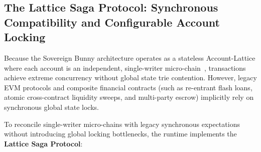 \documentclass[a4paper,11pt,twoside,parskip=half-,headings=small]{scrartcl}
\begin{document}
\subsection{The Lattice Saga Protocol: Synchronous Compatibility and Configurable Account Locking}
\label{sec:saga_locking}

Because the Sovereign Bunny architecture operates as a stateless Account-Lattice where each account is an independent, single-writer micro-chain~\cite{lemahieu2018nano,buterin2021stateless}, transactions achieve extreme concurrency without global state trie contention. However, legacy EVM protocols and composite financial contracts (such as re-entrant flash loans, atomic cross-contract liquidity sweeps, and multi-party escrow) implicitly rely on synchronous global state locks.

To reconcile single-writer micro-chains with legacy synchronous expectations without introducing global locking bottlenecks, the runtime implements the \textbf{Lattice Saga Protocol}:
\end{document}

